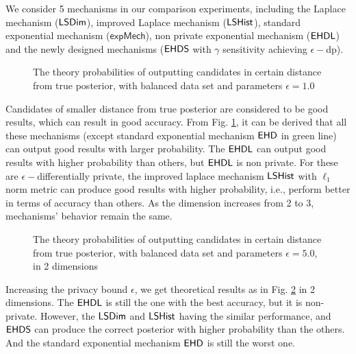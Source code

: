 \documentclass{article}
\begin{document}
We consider 5 mechanisms in our comparison experiments, including the Laplace mechanism ($\mathsf{LSDim}$), improved Laplace mechanism ($\mathsf{LSHist}$),
standard exponential mechanism ($\mathsf{expMech}$),
non private exponential mechanism ($\mathsf{EHDL}$) and the newly designed mechanisms ($\mathsf{EHDS}$ with $\gamma$ sensitivity achieving $\epsilon-$dp).

\begin{figure}
\begin{center}
\centering
\caption{The theory probabilities of outputting candidates in certain distance from true posterior, with balanced data set and parameters $\epsilon = 1.0$}
\label{fig_theory}
\end{center}
\end{figure}

Candidates of smaller distance from true posterior are considered to be good results, which can result in good accuracy. From Fig. \ref{fig_theory}, it can be derived that all these mechanisms (except standard exponential mechanism $\mathsf{EHD}$ in green line) can output good results with larger probability. The $\mathsf{EHDL}$ can output good results with higher probability than others, but $\mathsf{EHDL}$ is non private. For these are $\epsilon -$differentially private, the improved laplace mechanism $\mathsf{LSHist}$ with $\ell_1$ norm metric can produce good results with higher probability, i.e., perform better in terms of accuracy than others. As the dimension increases from 2 to 3, mechanisms' behavior remain the same.

\begin{figure}
\begin{center}
\centering
\caption{The theory probabilities of outputting candidates in certain distance from true posterior, with balanced data set and parameters $\epsilon = 5.0$, in 2 dimensions}
\label{fig_theory_epsilon}
\end{center}
\end{figure}

Increasing the privacy bound $\epsilon$, we get theoretical results as in Fig. \ref{fig_theory_epsilon} in 2 dimensions. The $\mathsf{EHDL}$ is still the one with the best accuracy, but it is non-private. However, the $\mathsf{LSDim}$ and $\mathsf{LSHist}$ having the similar performance, and $\mathsf{EHDS}$ can produce the correct posterior with higher probability than the others. And the standard exponential mechanism $\mathsf{EHD}$ is still the worst one.
\end{document}
